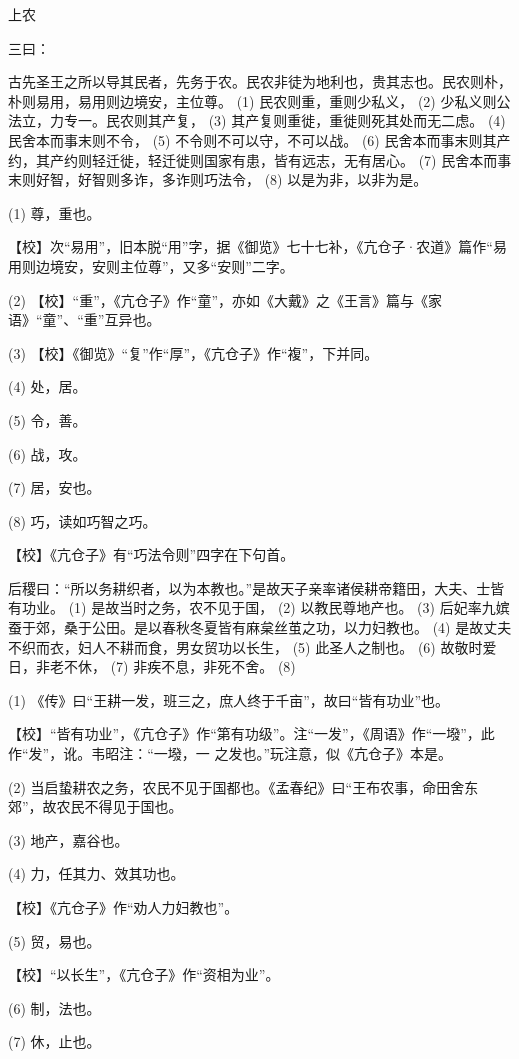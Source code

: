 \documentclass[12pt,UTF8]{ctexbook}
\begin{document}
上农


三曰：

古先圣王之所以导其民者，先务于农。民农非徒为地利也，贵其志也。民农则朴，朴则易用，易用则边境安，主位尊。 (1) 民农则重，重则少私义， (2) 少私义则公法立，力专一。民农则其产复， (3) 其产复则重徙，重徙则死其处而无二虑。 (4) 民舍本而事末则不令， (5) 不令则不可以守，不可以战。 (6) 民舍本而事末则其产约，其产约则轻迁徙，轻迁徙则国家有患，皆有远志，无有居心。 (7) 民舍本而事末则好智，好智则多诈，多诈则巧法令， (8) 以是为非，以非为是。

(1) 尊，重也。

【校】次“易用”，旧本脱“用”字，据《御览》七十七补，《亢仓子·农道》篇作“易用则边境安，安则主位尊”，又多“安则”二字。

(2) 【校】“重”，《亢仓子》作“童”，亦如《大戴》之《王言》篇与《家语》“童”、“重”互异也。

(3) 【校】《御览》“复”作“厚”，《亢仓子》作“複”，下并同。

(4) 处，居。

(5) 令，善。

(6) 战，攻。

(7) 居，安也。

(8) 巧，读如巧智之巧。

【校】《亢仓子》有“巧法令则”四字在下句首。

后稷曰：“所以务耕织者，以为本教也。”是故天子亲率诸侯耕帝籍田，大夫、士皆有功业。 (1) 是故当时之务，农不见于国， (2) 以教民尊地产也。 (3) 后妃率九嫔蚕于郊，桑于公田。是以春秋冬夏皆有麻枲丝茧之功，以力妇教也。 (4) 是故丈夫不织而衣，妇人不耕而食，男女贸功以长生， (5) 此圣人之制也。 (6) 故敬时爱日，非老不休， (7) 非疾不息，非死不舍。 (8)

(1) 《传》曰“王耕一发，班三之，庶人终于千亩”，故曰“皆有功业”也。

【校】“皆有功业”，《亢仓子》作“第有功级”。注“一发”，《周语》作“一墢”，此作“发”，讹。韦昭注：“一墢，一 之发也。”玩注意，似《亢仓子》本是。

(2) 当启蛰耕农之务，农民不见于国都也。《孟春纪》曰“王布农事，命田舍东郊”，故农民不得见于国也。

(3) 地产，嘉谷也。

(4) 力，任其力、效其功也。

【校】《亢仓子》作“劝人力妇教也”。

(5) 贸，易也。

【校】“以长生”，《亢仓子》作“资相为业”。

(6) 制，法也。

(7) 休，止也。
\end{document}
